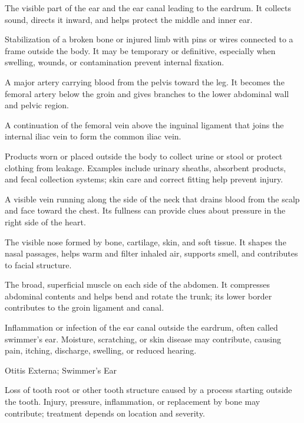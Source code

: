  The visible part of the ear and the ear canal leading to the eardrum. It collects sound, directs it inward, and helps protect the middle and inner ear.

 Stabilization of a broken bone or injured limb with pins or wires connected to a frame outside the body. It may be temporary or definitive, especially when swelling, wounds, or contamination prevent internal fixation.

 A major artery carrying blood from the pelvis toward the leg. It becomes the femoral artery below the groin and gives branches to the lower abdominal wall and pelvic region.

 A continuation of the femoral vein above the inguinal ligament that joins the internal iliac vein to form the common iliac vein.

 Products worn or placed outside the body to collect urine or stool or protect clothing from leakage. Examples include urinary sheaths, absorbent products, and fecal collection systems; skin care and correct fitting help prevent injury.

 A visible vein running along the side of the neck that drains blood from the scalp and face toward the chest. Its fullness can provide clues about pressure in the right side of the heart.

 The visible nose formed by bone, cartilage, skin, and soft tissue. It shapes the nasal passages, helps warm and filter inhaled air, supports smell, and contributes to facial structure.

 The broad, superficial muscle on each side of the abdomen. It compresses abdominal contents and helps bend and rotate the trunk; its lower border contributes to the groin ligament and canal.

 Inflammation or infection of the ear canal outside the eardrum, often called swimmer’s ear. Moisture, scratching, or skin disease may contribute, causing pain, itching, discharge, swelling, or reduced hearing.

\synonyms
Otitis Externa; Swimmer's Ear

 Loss of tooth root or other tooth structure caused by a process starting outside the tooth. Injury, pressure, inflammation, or replacement by bone may contribute; treatment depends on location and severity.

